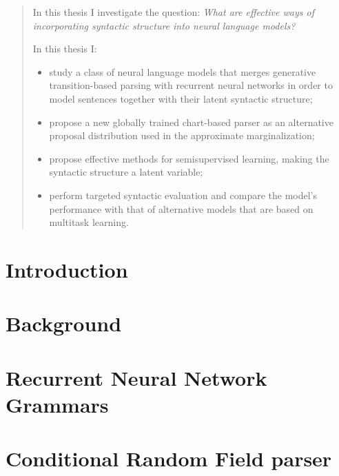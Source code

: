 \documentclass[examplefnt,biber]{../src/nowfnt}
\subtitle{Neural language models with latent syntax}
\begin{document}
\makeabstracttitle

\begin{abstract}
In this thesis I investigate the question: \textit{What are effective ways of incorporating syntactic structure into neural language models?}

In this thesis I:
\begin{itemize}
  \item study a class of neural language models that merges generative transition-based parsing with recurrent neural networks in order to model sentences together with their latent syntactic structure;
  \item propose a new globally trained chart-based parser as an alternative proposal distribution used in the approximate marginalization;
  \item propose effective methods for semisupervised learning, making the syntactic structure a latent variable;
  \item perform targeted syntactic evaluation and compare the model's performance with that of alternative models that are based on multitask learning.
\end{itemize}
\end{abstract}

\begin{acknowledgements}
\end{acknowledgements}




\chapter{Introduction}
\label{01-introduction}



\chapter{Background}
\label{02-background}



\chapter{Recurrent Neural Network Grammars}
\label{03-rnng}



\chapter{Conditional Random Field parser}
\label{04-crf}

\end{document}
